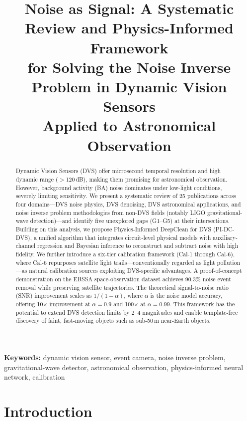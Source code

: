 \documentclass[12pt]{article}
\title{Noise as Signal: A Systematic Review and Physics-Informed Framework\\
for Solving the Noise Inverse Problem in Dynamic Vision Sensors\\
Applied to Astronomical Observation}
\author{
}
\date{}
\begin{document}
\maketitle

\begin{abstract}
Dynamic Vision Sensors (DVS) offer microsecond temporal resolution and high dynamic range ($>$120\,dB), making them promising for astronomical observation.
However, background activity (BA) noise dominates under low-light conditions, severely limiting sensitivity.
We present a systematic review of 25 publications across four domains---DVS noise physics, DVS denoising, DVS astronomical applications, and noise inverse problem methodologies from non-DVS fields (notably LIGO gravitational-wave detection)---and identify five unexplored gaps (G1--G5) at their intersections.
Building on this analysis, we propose Physics-Informed DeepClean for DVS (PI-DC-DVS), a unified algorithm that integrates circuit-level physical models with auxiliary-channel regression and Bayesian inference to reconstruct and subtract noise with high fidelity.
We further introduce a six-tier calibration framework (Cal-1 through Cal-6), where Cal-6 repurposes satellite light trails---conventionally regarded as light pollution---as natural calibration sources exploiting DVS-specific advantages.
A proof-of-concept demonstration on the EBSSA space-observation dataset achieves 90.3\% noise event removal while preserving satellite trajectories.
The theoretical signal-to-noise ratio (SNR) improvement scales as $1/(1-\alpha)$, where $\alpha$ is the noise model accuracy, offering 10$\times$ improvement at $\alpha=0.9$ and 100$\times$ at $\alpha=0.99$.
This framework has the potential to extend DVS detection limits by 2--4 magnitudes and enable template-free discovery of faint, fast-moving objects such as sub-50\,m near-Earth objects.
\end{abstract}

\noindent\textbf{Keywords:} dynamic vision sensor, event camera, noise inverse problem, gravitational-wave detector, astronomical observation, physics-informed neural network, calibration

\section{Introduction}
\label{sec:intro}
\end{document}

